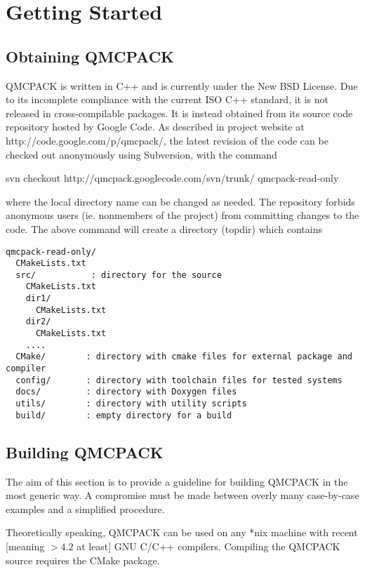 \chapter{Getting Started}
\section{Obtaining QMCPACK}
QMCPACK is written in C++ and is currently under the New BSD License.  Due to its incomplete compliance with the current ISO C++ standard, it is not released in cross-compilable packages.  It is instead obtained from its source code repository hosted by Google Code.  As described in project website at http://code.google.com/p/qmcpack/, the latest revision of the code can be checked out anonymously using Subversion, with the command
\begin{lstcnsl}
svn checkout http://qmcpack.googlecode.com/svn/trunk/ qmcpack-read-only
\end{lstcnsl}
where the local directory name  can be changed as needed.  The repository forbids anonymous users (ie. nonmembers of the project) from committing changes to the code.  The above command will create a directory  (topdir) which contains
\begin{verbatim} 
qmcpack-read-only/
  CMakeLists.txt
  src/           : directory for the source
    CMakeLists.txt
    dir1/
      CMakeLists.txt
    dir2/
      CMakeLists.txt
    ....
  CMake/        : directory with cmake files for external package and compiler
  config/       : directory with toolchain files for tested systems
  docs/         : directory with Doxygen files
  utils/        : directory with utility scripts
  build/        : empty directory for a build 
\end{verbatim}

\section{Building QMCPACK}
The aim of this section is to provide a guideline for building QMCPACK in the most generic way.
A compromise must be made between overly many case-by-case examples and a simplified procedure.

Theoretically speaking, QMCPACK can be used on any *nix machine with recent [meaning $> 4.2$ at least] GNU C/C++ compilers.
Compiling the QMCPACK source requires the CMake package.

